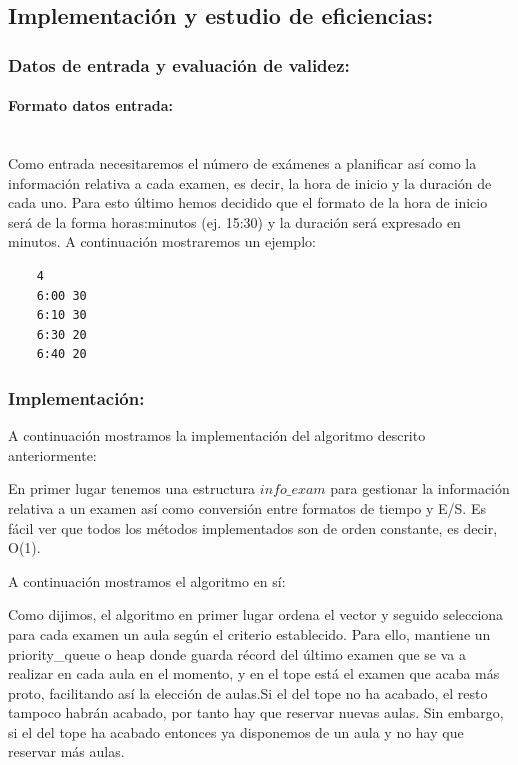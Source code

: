 \documentclass{article}
\newcommand{\myparagraph}[1]{\paragraph{#1}\mbox{}\\}
\begin{document}
\subsection{Implementación y estudio de eficiencias: }

\subsubsection{Datos de entrada y evaluación de validez: }

\myparagraph{Formato datos entrada: }
    Como entrada necesitaremos el número de exámenes a planificar así como 
    la información relativa a cada examen, es decir, la hora de inicio y 
    la duración de cada uno. Para esto último hemos decidido que el formato de la hora de inicio será de la forma horas:minutos (ej. 15:30) y la duración será expresado en minutos. A continuación 
    mostraremos un ejemplo: 

    \begin{verbatim}
    4
    6:00 30
    6:10 30
    6:30 20
    6:40 20
    \end{verbatim}
    
\subsubsection{Implementación: }
    A continuación mostramos la implementación del algoritmo descrito anteriormente: 

    En primer lugar tenemos una estructura $info\_exam$ para gestionar la información relativa a un examen así como conversión entre formatos de tiempo y E/S. Es fácil ver que todos los métodos implementados son de orden constante, es decir, O(1).
    
    

    A continuación mostramos el algoritmo en sí:
    
    
    
    Como dijimos, el algoritmo en primer lugar ordena el vector y seguido
    selecciona para cada examen un aula según el criterio establecido.
    Para ello, mantiene un priority\_queue o heap donde guarda récord del último examen que se va a realizar en cada aula en el momento, y en el 
    tope está el examen que acaba más proto, facilitando así la elección
    de aulas.Si el del tope no ha acabado, el resto tampoco habrán 
    acabado, por tanto hay que reservar nuevas aulas. Sin embargo, si el 
    del tope ha acabado entonces ya disponemos de un aula y no hay que reservar más aulas.
    
\end{document}
